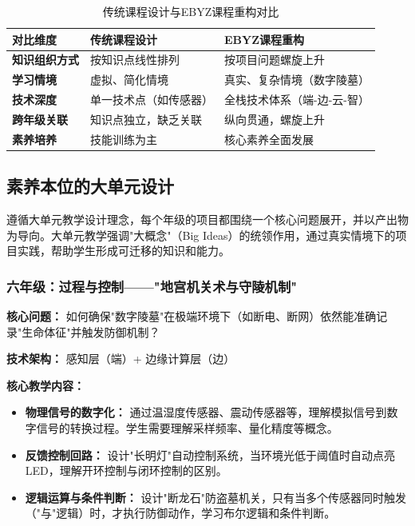 \documentclass[12pt,a4paper,fontset=fandol]{ctexart}
\begin{document}
\begin{table}[H]
    \centering
    \caption{传统课程设计与EBYZ课程重构对比}
    \label{tab:curriculum-comparison}
    \begin{tabular}{p{3cm}p{4cm}p{4cm}}
        \toprule
        \textbf{对比维度} & \textbf{传统课程设计} & \textbf{EBYZ课程重构} \\
        \midrule
        \textbf{知识组织方式} & 按知识点线性排列 & 按项目问题螺旋上升 \\
        \midrule
        \textbf{学习情境} & 虚拟、简化情境 & 真实、复杂情境（数字陵墓） \\
        \midrule
        \textbf{技术深度} & 单一技术点（如传感器） & 全栈技术体系（端-边-云-智） \\
        \midrule
        \textbf{跨年级关联} & 知识点独立，缺乏关联 & 纵向贯通，螺旋上升 \\
        \midrule
        \textbf{素养培养} & 技能训练为主 & 核心素养全面发展 \\
        \bottomrule
    \end{tabular}
\end{table}

\subsection{素养本位的大单元设计}
遵循大单元教学设计理念，每个年级的项目都围绕一个核心问题展开，并以产出物为导向。大单元教学强调"大概念"（Big Ideas）的统领作用，通过真实情境下的项目实践，帮助学生形成可迁移的知识和能力\cite{wiggins2005}。

\subsubsection{六年级：过程与控制——"地宫机关术与守陵机制"}
\textbf{核心问题：} 如何确保"数字陵墓"在极端环境下（如断电、断网）依然能准确记录"生命体征"并触发防御机制？

\textbf{技术架构：} 感知层（端）+ 边缘计算层（边）

\textbf{核心教学内容：}
\begin{itemize}
    \item \textbf{物理信号的数字化：} 通过温湿度传感器、震动传感器等，理解模拟信号到数字信号的转换过程。学生需要理解采样频率、量化精度等概念。
    \item \textbf{反馈控制回路：} 设计"长明灯"自动控制系统，当环境光低于阈值时自动点亮LED，理解开环控制与闭环控制的区别。
    \item \textbf{逻辑运算与条件判断：} 设计"断龙石"防盗墓机关，只有当多个传感器同时触发（"与"逻辑）时，才执行防御动作，学习布尔逻辑和条件判断。
\end{itemize}
\end{document}
